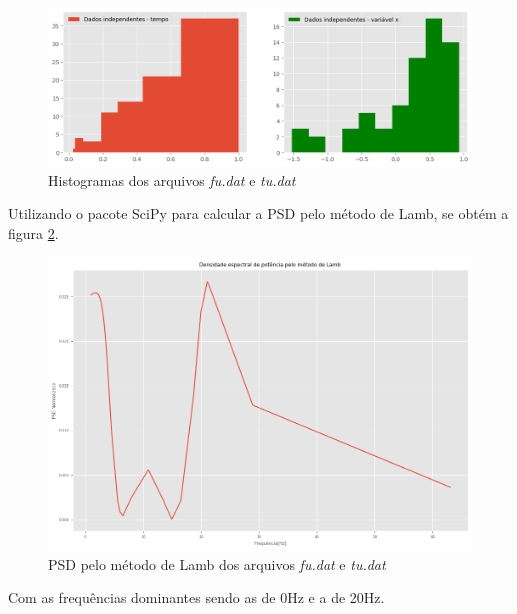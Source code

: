\documentclass[12pt,a4paper,portuguese]{article}
\begin{document}
\begin{figure}[H]
	\centering
	\includegraphics[width=1\linewidth]{lista5-4a}
	\caption{Histogramas dos arquivos \textit{fu.dat} e \textit{tu.dat}}
	\label{fig:lista5-4a}
\end{figure}

Utilizando o pacote SciPy para calcular a PSD pelo método de Lamb, se obtém a figura \ref{fig:lista5-4b}.

\begin{figure}[H]
	\centering
	\includegraphics[width=1\linewidth]{lista5-4b}
	\caption{PSD pelo método de Lamb dos arquivos \textit{fu.dat} e \textit{tu.dat}}
	\label{fig:lista5-4b}
\end{figure}
Com as frequências dominantes sendo as de 0Hz e a de 20Hz.
\end{document}
